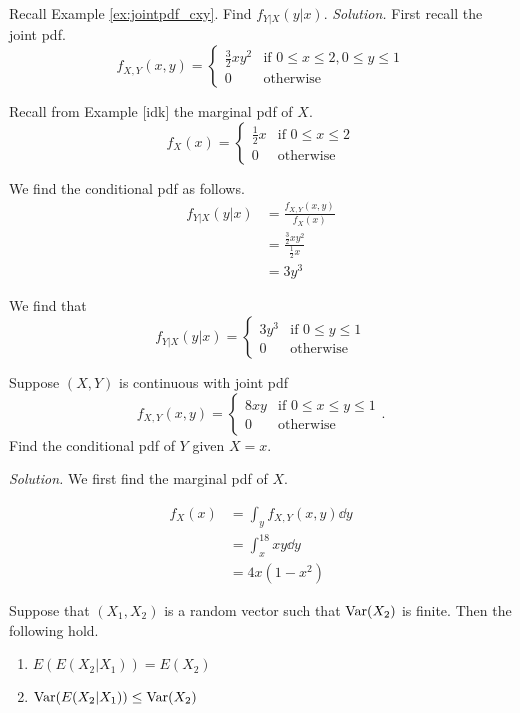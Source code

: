 \begin{example}[]
	Recall Example \ref{ex:jointpdf_cxy}. Find $f_{Y|X}(y|x)$.
{}
	\textit{Solution.} First recall the joint pdf.
	$$f_{X,Y}(x,y)=\begin{cases}
		\frac 32 xy^2 & \text{if }0\leq x\leq 2,0\leq y\leq 1\\
		0 & \text{otherwise}
	\end{cases}$$

	Recall from Example [idk] the marginal pdf of $X$.
	$$f_X(x)=\begin{cases}
		\frac 12 x & \text{if }0\leq x\leq 2\\
		0 & \text{otherwise}
	\end{cases}$$

	We find the conditional pdf as follows.
	\begin{align*}
		f_{Y|X}(y|x)&=\frac{f_{X,Y}(x,y)}{f_{X}(x)}\\
		&=\frac{\frac 32 xy^2}{\frac 12 x}\\
		&=3y^3
	\end{align*}

	We find that $$f_{Y|X}(y|x)=\begin{cases}
		3y^3 & \text{if }0\leq y\leq 1\\
		0 & \text{otherwise}
	\end{cases}$$
\end{example}

\begin{example}[]
	Suppose $(X,Y)$ is continuous with joint pdf
	$$f_{X,Y}(x,y)=\begin{cases}
		8 xy & \text{if }0\leq x\leq y\leq 1\\
		0 & \text{otherwise}
	\end{cases}.$$
	Find the conditional pdf of $Y$ given $X=x$.

	\textit{Solution.} We first find the marginal pdf of $X$.

	\begin{align*}
		f_X(x)&=\int_yf_{X,Y}(x,y)\dd y\\
		&=\int_x^18xy\dd y\\
		&=4x(1-x^2)
	\end{align*}
\end{example}

\begin{theorem}
	Suppose that $(X_1,X_2)$ is a random vector such that $\operatorname{Var}(X_2)$ is finite. Then the following hold.
	\begin{enumerate}
		\item $E(E(X_2|X_1))=E(X_2)$
		\item $\operatorname{Var}(E(X_2|X_1))\leq\operatorname{Var}(X_2)$
	\end{enumerate}
\end{theorem}

